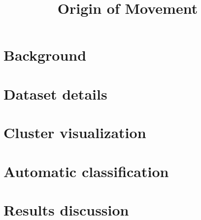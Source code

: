 \documentclass{report}
\title{Origin of Movement}
\begin{document}
\titleformat{\part}[display]
  {\centering\Huge\bfseries}{\partname\ \thepart}{20pt}{\Huge}

\coverpage





\newpage
\renewcommand{\contentsname}{\Huge Table of contents}
\tableofcontents
\newpage
\renewcommand{\listfigurename}{\Huge List of Figures}
\listoffigures
\newpage
\renewcommand{\listtablename}{\Huge List of Tables}
\listoftables
\newpage


\newpage


\part{Background}



%
\part{Dataset details}

\part{Cluster visualization}



\part{Automatic classification}


\part{Results discussion}





\nocite{*}
\end{document}

